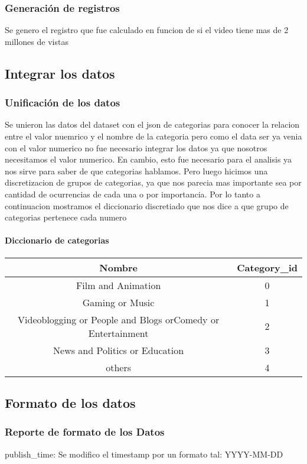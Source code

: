     \subsubsection{Generación de registros}
        Se genero el registro  que fue calculado en funcion de si
        el video tiene mas de 2 millones de vistas

\subsection{Integrar los datos}
    \subsubsection{Unificación de los datos}

        Se unieron las datos del dataset con el json de categorias para conocer
        la relacion entre el valor nuemrico y el nombre de la categoria pero como
        el data ser ya venia con el valor numerico no fue necesario integrar los
        datos ya que nosotros necesitamos el valor numerico. En cambio, esto fue
        necesario para el analisis ya nos sirve para saber de que categorias
        hablamos. Pero luego hicimos una discretizacion de grupos de categorias,
        ya que nos parecia mas importante sea por cantidad de ocurrencias de
        cada una o por importancia.
        Por lo tanto a continuacion mostramos el diccionario discretiado que nos
        dice a que grupo de categorias pertenece cada numero\\

        \paragraph{Diccionario de categorias}

            \begin{center}
                \begin{tabular}{||c | c||}
                    \hline
                    \textbf{Nombre} & \textbf{Category\_id} \\ [0.5ex]
                    \hline\hline
                    Film and Animation & 0 \\
                    \hline
                    Gaming or Music & 1 \\
                    \hline
                    Videoblogging or People and Blogs orComedy or Entertainment & 2 \\
                    \hline
                    News and Politics or Education & 3 \\
                    \hline
                    others & 4 \\
                    \hline
                \end{tabular}
            \end{center}

\subsection{Formato de los datos}
    \subsubsection{Reporte de formato de los Datos}
        publish\_time: Se modifico el timestamp por un formato tal: YYYY-MM-DD
